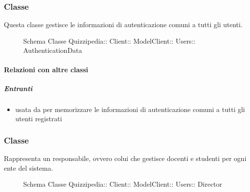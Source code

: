 \subsubsection{Classe }
Questa classe gestisce le informazioni di autenticazione comuni a tutti gli utenti.
\begin{figure}[H]
\centering
\noindent{}
\caption[Schema Classe AuthenticationData]{Schema Classe Quizzipedia:: Client:: ModelClient:: Users:: AuthenticationData}
\end{figure}
\paragraph{Relazioni con altre classi}
\subparagraph{Entranti}
\begin{itemize}
\item usata da  per memorizzare le informazioni di autenticazione comuni a tutti gli utenti registrati
\end{itemize}
\subsubsection{Classe }
Rappresenta un responsabile, ovvero colui che gestisce docenti e studenti per ogni ente del sistema.
\begin{figure}[H]
\centering
\noindent{}
\caption[Schema Classe Director]{Schema Classe Quizzipedia:: Client:: ModelClient:: Users:: Director}
\end{figure}
